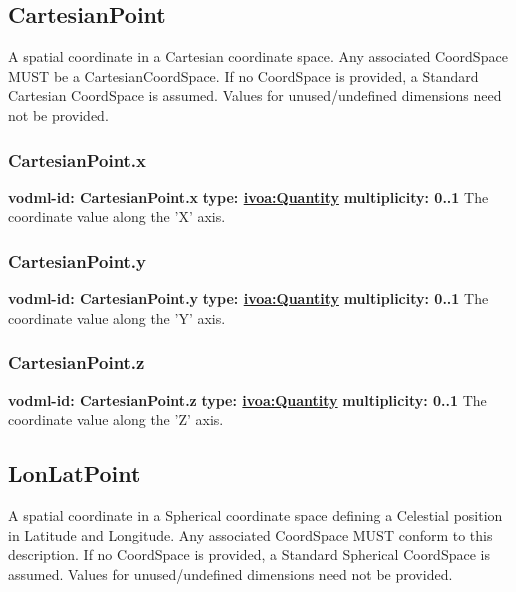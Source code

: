   \subsection{CartesianPoint}
  \label{sect:CartesianPoint}
    A spatial coordinate in a Cartesian coordinate space. Any associated CoordSpace MUST be a CartesianCoordSpace. If no CoordSpace is provided, a Standard Cartesian CoordSpace is assumed. Values for unused/undefined dimensions need not be provided.

    \subsubsection{CartesianPoint.x}
      \textbf{vodml-id: CartesianPoint.x} \newline
      \textbf{type: \hyperref[sect:ivoa]{ivoa:Quantity}} \newline
      \textbf{multiplicity: 0..1} \newline 
      The coordinate value along the 'X' axis.

    \subsubsection{CartesianPoint.y}
      \textbf{vodml-id: CartesianPoint.y} \newline
      \textbf{type: \hyperref[sect:ivoa]{ivoa:Quantity}} \newline
      \textbf{multiplicity: 0..1} \newline 
      The coordinate value along the 'Y' axis.

    \subsubsection{CartesianPoint.z}
      \textbf{vodml-id: CartesianPoint.z} \newline
      \textbf{type: \hyperref[sect:ivoa]{ivoa:Quantity}} \newline
      \textbf{multiplicity: 0..1} \newline 
      The coordinate value along the 'Z' axis.


  \subsection{LonLatPoint}
  \label{sect:LonLatPoint}
    A spatial coordinate in a Spherical coordinate space defining a Celestial position in Latitude and Longitude. Any associated CoordSpace MUST conform to this description. If no CoordSpace is provided, a Standard Spherical CoordSpace is assumed. Values for unused/undefined dimensions need not be provided.

